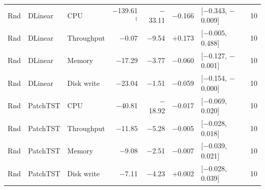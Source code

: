 \documentclass[a4paper,11pt]{article}
\begin{document}
\begin{longtable}{@{}lllrrrlr@{}}
Rnd & DLinear & CPU & $-$139.61$^{\dagger}$ & $-$33.11 & $-$0.166 & [$-$0.343, $-$0.009] & 10 \\
Rnd & DLinear & Throughput & $-$0.07 & $-$9.54 & +0.173 & [$-$0.005, 0.488] & 10 \\
Rnd & DLinear & Memory & $-$17.29 & $-$3.77 & $-$0.060 & [$-$0.127, $-$0.001] & 10 \\
Rnd & DLinear & Disk write & $-$23.04 & $-$1.51 & $-$0.059 & [$-$0.154, $-$0.000] & 10 \\
Rnd & PatchTST & CPU & $-$40.81 & $-$18.92 & $-$0.017 & [$-$0.069, 0.020] & 10 \\
Rnd & PatchTST & Throughput & $-$11.85 & $-$5.28 & $-$0.005 & [$-$0.028, 0.018] & 10 \\
Rnd & PatchTST & Memory & $-$9.08 & $-$2.51 & $-$0.007 & [$-$0.039, 0.021] & 10 \\
Rnd & PatchTST & Disk write & $-$7.11 & $-$4.23 & +0.002 & [$-$0.028, 0.039] & 10 \\
\end{longtable}
\normalsize\setlength{\tabcolsep}{4pt}
\end{document}
